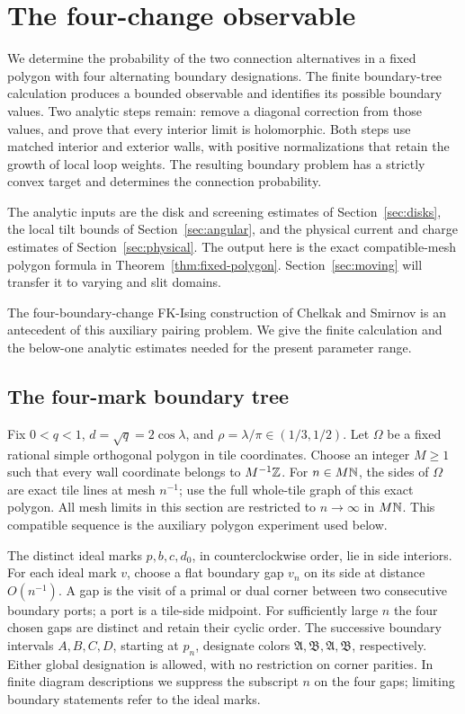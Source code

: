 \section{The four-change observable}
\label{sec:observable}

We determine the probability of the two connection alternatives in a
fixed polygon with four alternating boundary designations.  The finite
boundary-tree calculation produces a bounded observable and identifies
its possible boundary values.  Two analytic steps remain: remove a
diagonal correction from those values, and prove that every interior
limit is holomorphic.  Both steps use matched interior and exterior
walls, with positive normalizations that retain the growth of local
loop weights.  The resulting boundary problem has a strictly convex
target and determines the connection probability.

The analytic inputs are the disk and screening estimates of
Section~\ref{sec:disks}, the local tilt bounds of
Section~\ref{sec:angular}, and the physical current and charge estimates
of Section~\ref{sec:physical}.  The output here is the exact
compatible-mesh polygon formula in Theorem~\ref{thm:fixed-polygon}.
Section~\ref{sec:moving} will transfer it to varying and slit domains.

The four-boundary-change FK-Ising construction of Chelkak and Smirnov
\cite[Section~6]{ChelkakSmirnov2012} is an antecedent of this auxiliary
pairing problem.  We give the finite calculation and the below-one
analytic estimates needed for the present parameter range.

\subsection{The four-mark boundary tree}

Fix $0<q<1$, $d=\sqrt q=2\cos\lambda$, and
$\rho=\lambda/\pi\in(1/3,1/2)$.  Let $\Omega$ be a fixed rational
simple orthogonal polygon in tile coordinates.  Choose an integer
$M\ge1$ such that every wall coordinate belongs to $M^{-1}\mathbb Z$.
For $n\in M\mathbb N$, the sides of $\Omega$ are exact tile lines at mesh
$n^{-1}$; use the full whole-tile graph of this exact polygon.
All mesh limits in this section are restricted to $n\to\infty$ in
$M\mathbb N$.  This compatible sequence is the auxiliary polygon experiment
used below.

The distinct ideal marks $p,b,c,d_0$, in counterclockwise order, lie
in side interiors.  For each ideal mark $v$, choose a flat boundary
gap $v_n$ on its side at distance $O(n^{-1})$.  A gap is the visit
of a primal or dual corner between two consecutive boundary ports;
a port is a tile-side midpoint.  For sufficiently large $n$ the
four chosen gaps are distinct and retain their cyclic order.  The
successive boundary intervals $A,B,C,D$, starting at $p_n$, designate
colors $\mathfrak A,\mathfrak B,\mathfrak A,\mathfrak B$, respectively.
Either global designation is allowed, with no restriction on corner
parities.  In finite diagram descriptions we suppress the subscript
$n$ on the four gaps; limiting boundary statements refer to the ideal
marks.

